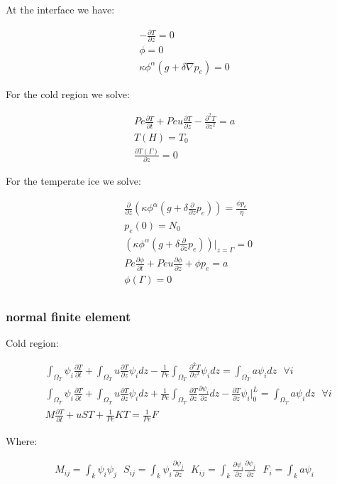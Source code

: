 \documentclass[a4paper,12pt]{article}
\newcommand{\pd}[2]{\frac{\partial #1}{\partial #2}}
\newcommand{\pdt}[2]{\frac{\partial^2 #1}{\partial #2 ^2}}
\begin{document}
At the interface we have:

\begin{align*}
  -\pd{T}{z} = 0\\
  \phi = 0\\
  \kappa \phi^\alpha( g + \delta \nabla p_e) = 0
\end{align*}

For the cold region we solve:

\begin{align}
  Pe\pd{T}{t} + Pe u \pd{T}{z} - \pdt{T}{z} = a \\
  T(H) = T_0\\
  \pd{T(\Gamma)}{z} = 0
\end{align}

For the temperate ice we solve:

\begin{align}
  &\pd{}{z}\left(\kappa\phi^\alpha\left(g + \delta\pd{}{z}p_e\right)\right) = \frac{\phi p_e}{\eta} \label{eq:pe-equation}\\
  &p_e(0) = N_0\\
  &\left(\kappa \phi^\alpha\left( g + \delta \pd{}{z} p_e\right)\right)\bigg\rvert_{z=\Gamma} = 0\\
  &Pe\pd{\phi}{t} + Pe u \pd{\phi}{z} + \phi p_e = a \label{eq:phi-equation}\\
  &\phi(\Gamma) = 0\\
\end{align}

\subsubsection{normal finite element}

Cold region:

\begin{align*}
  &\int_{\Omega_T} \psi_i\pd{T}{t} + \int_{\Omega_T} u \pd{T}{z}\psi_i dz - \frac{1}{Pe}\int_{\Omega_T} \pdt{T}{z}\psi_i dz = \int_{\Omega_T} a\psi_i dz ~~~ \forall i \\
  &\int_{\Omega_T} \psi_i\pd{T}{t} + \int_{\Omega_T} u \pd{T}{z}\psi_i dz + \frac{1}{Pe}\int_{\Omega_T} \pd{T}{z}\pd{\psi_i}{z} dz - \pd{T}{z} \psi_i \bigg\rvert_0^L = \int_{\Omega_T} a\psi_i dz ~~~ \forall i \\
  & M\pd{T}{t} + uST + \frac{1}{Pe}KT = \frac{1}{Pe}F
\end{align*}

Where:

\begin{align*}
  M_{ij} = \int_k\psi_i\psi_j ~~~ S_{ij} = \int_k\psi_i\pd{\psi_j}{z} ~~~ K_{ij} = \int_k\pd{\psi_i}{z}\pd{\psi_j}{z} ~~~ F_i = \int_ka\psi_i
\end{align*}
\end{document}
